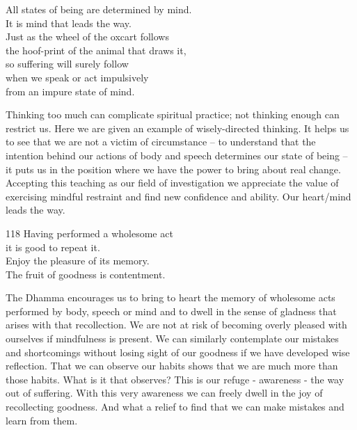 
\begin{dhpVerse}{1}
\label{dhp-1}
All states of being are determined by mind.\\
It is mind that leads the way.\\
Just as the wheel of the oxcart follows\\
the hoof-print of the animal that draws it,\\
so suffering will surely follow\\
when we speak or act impulsively\\
from an impure state of mind.
\end{dhpVerse}

\begin{dhpRefl}

Thinking too much can complicate spiritual practice; not thinking
enough can restrict us. Here we are given an example of
wisely-directed thinking. It helps us to see that we are not a victim
of circumstance -- to understand that the intention behind our
actions of body and speech determines our state of being -- it puts
us in the position where we have the power to bring about real
change. Accepting this teaching as our field of investigation we
appreciate the value of exercising mindful restraint and find new
confidence and ability. Our heart/mind leads the way.

\end{dhpRefl}


\begin{dhpVerse}{118}
\label{dhp-118}
Having performed a wholesome act\\
it is good to repeat it.\\
Enjoy the pleasure of its memory.\\
The fruit of goodness is contentment.
\end{dhpVerse}

\begin{dhpRefl}

The Dhamma encourages us to bring to heart the memory of wholesome
acts performed by body, speech or mind and to dwell in the sense of
gladness that arises with that recollection. We are not at risk of
becoming overly pleased with ourselves if mindfulness is present. We
can similarly contemplate our mistakes and shortcomings without
losing sight of our goodness if we have developed wise reflection.
That we can observe our habits shows that we are much more than those
habits. What is it that observes? This is our refuge - awareness -
the way out of suffering. With this very awareness we can freely
dwell in the joy of recollecting goodness. And what a relief to find
that we can make mistakes and learn from them.

\end{dhpRefl}

